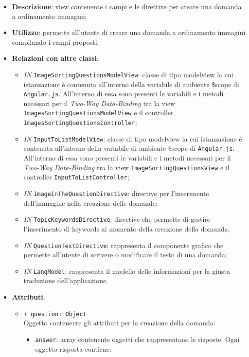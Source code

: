 \begin{itemize}
	\item \textbf{Descrizione}: view contenente i campi e le direttive per creare una domanda a ordinamento immagini;
	\item \textbf{Utilizzo}: permette all'utente di creare una domanda a ordinamento immagini compilando i campi proposti;
	\item \textbf{Relazioni con altre classi}:
	\begin{itemize}
		\item \textit{IN} \texttt{ImageSortingQuestionsModelView}: classe di tipo modelview la cui istanzazione è contenuta all'interno della variabile di ambiente \$scope di \texttt{Angular.js}. All'interno di essa sono presenti le variabili e i metodi necessari per il \textit{Two-Way Data-Binding} tra la view \texttt{ImagesSortingQuestionsModelView} e il controller \texttt{ImagesSortingQuestionsController};
		\item \textit{IN} \texttt{InputToListModelView}: classe di tipo modelview la cui istanzazione è contenuta all'interno della variabile di ambiente \$scope di \texttt{Angular.js}. All'interno di essa sono presenti le variabili e i metodi necessari per il \textit{Two-Way Data-Binding} tra la view \texttt{ImageSortingQuestionsView} e il controller \texttt{InputToListController};
		\item \textit{IN} \texttt{ImageInTheQuestionDirective}: directive per l'inserimento dell'immagine nella creazione delle domande;
		\item \textit{IN} \texttt{TopicKeywordsDirective}: directive che permette di gestire l'inserimento di keywords al momento della creazione della domanda;
		\item \textit{IN} \texttt{QuestionTextDirective}: rappresenta il componente grafico che permette all'utente di scrivere o modificare il testo di una domanda;
		\item \textit{IN} \texttt{LangModel}: rappresenta il modello delle informazioni per la giusta traduzione dell'applicazione.
	\end{itemize}
	\item \textbf{Attributi}:
	\begin{itemize}
			\item \texttt{+ question: Object} \\ Oggetto contenente gli attributi per la creazione della domanda:
			\begin{itemize}
				\item \texttt{answer}: array contenente oggetti che rappresentano le risposte. Ogni oggetto risposta contiene:

\end{itemize}
\end{itemize}
\end{itemize}
